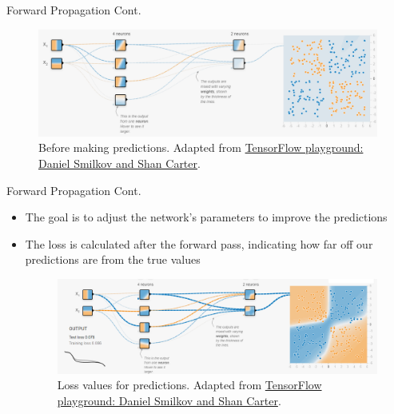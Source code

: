 \documentclass[serif, aspectratio=169]{beamer}
\begin{document}
\begin{frame}{Forward Propagation Cont.}
        \begin{figure}[h]
            \includegraphics[width=\linewidth]{pic/4/tensorflow0.png}\\
            {\scriptsize Before making predictions. Adapted from \href{playground.tensorflow.org}{TensorFlow playground: Daniel Smilkov and Shan Carter}.}
        \end{figure}
\end{frame}

\begin{frame}[t]{Forward Propagation Cont.}
    \begin{itemize}
        \item The goal is to adjust the network’s parameters to improve the predictions
        \item The loss is calculated after the forward pass, indicating how far off our predictions are from the true values
        \begin{figure}[bh]
            \centering
            \includegraphics[width=\linewidth]{pic/4/tensorflow2.png} \\
            {\scriptsize Loss values for predictions. Adapted from \href{playground.tensorflow.org}{TensorFlow playground: Daniel Smilkov and Shan Carter}.}
        \end{figure}
    \end{itemize}
\end{frame}
\end{document}
